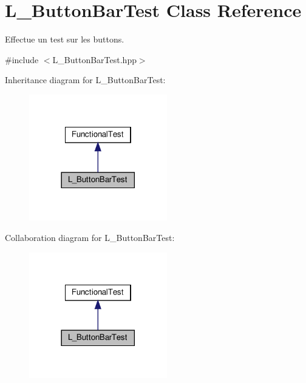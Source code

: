 \hypertarget{classL__ButtonBarTest}{}\section{L\+\_\+\+Button\+Bar\+Test Class Reference}
\label{classL__ButtonBarTest}


Effectue un test sur les buttons.  




{\ttfamily \#include $<$L\+\_\+\+Button\+Bar\+Test.\+hpp$>$}



Inheritance diagram for L\+\_\+\+Button\+Bar\+Test\+:
\nopagebreak
\begin{figure}[H]
\begin{center}
\leavevmode
\includegraphics[width=170pt]{classL__ButtonBarTest__inherit__graph}
\end{center}
\end{figure}


Collaboration diagram for L\+\_\+\+Button\+Bar\+Test\+:
\nopagebreak
\begin{figure}[H]
\begin{center}
\leavevmode
\includegraphics[width=170pt]{classL__ButtonBarTest__coll__graph}
\end{center}
\end{figure}
